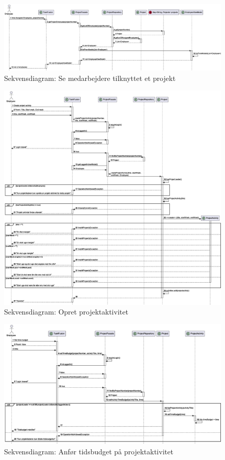 \begin{figure}[H]
    \centering
    \caption{Sekvensdiagram: Se medarbejdere tilknyttet et projekt}\label{fig:ViewAssignedEmployee}
    \includegraphics[width=\textwidth]{RequirementsAndDesign/SequenceDiagrams/seqViewAssignedEmployees.eps}
\end{figure}
\begin{figure}[H]
    \centering
    \caption{Sekvensdiagram: Opret projektaktivitet}\label{fig:sequenceCreateProjectActivity}
    \includegraphics[width=\textwidth]{RequirementsAndDesign/SequenceDiagrams/seqCreateProjectActivity.eps}
\end{figure}
\begin{figure}[H]
    \centering
    \caption{Sekvensdiagram: Anfør tidsbudget på projektaktivitet}\label{fig:sequenceSetTimeBudget}
    \includegraphics[width=\textwidth]{RequirementsAndDesign/SequenceDiagrams/seqSetTimeBudget.eps}
\end{figure}
